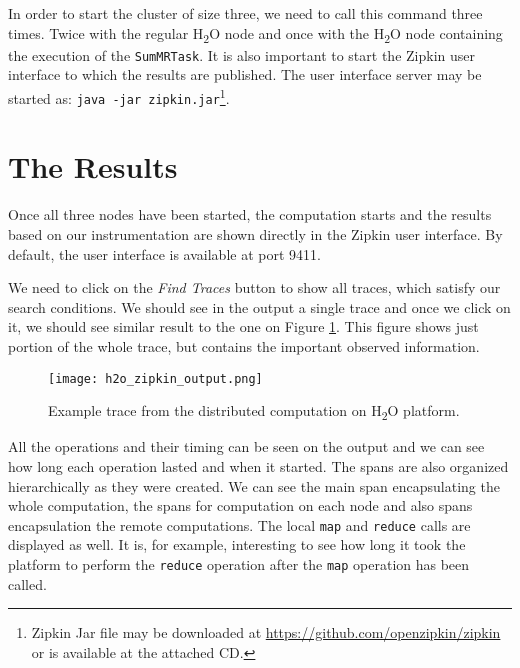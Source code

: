 In order to start the cluster of size three, we need to call this command three times. Twice with the regular H\textsubscript{2}O node and once with the H\textsubscript{2}O node containing the execution of the \texttt{SumMRTask}. It is also important to start the Zipkin user interface to which the results are published. The user interface server may be started as: \texttt{java -jar zipkin.jar}\footnote{Zipkin Jar file may be downloaded at \url{https://github.com/openzipkin/zipkin} or is available at the attached CD.}.
\section{The Results}
Once all three nodes have been started, the computation starts and the results based on our instrumentation are shown directly in the Zipkin user interface. By default, the user interface is available at port 9411.

We need to click on the \textit{Find Traces} button to show all traces, which satisfy our search conditions. We should see in the output a single trace and once we click on it, we should see similar result to the one on Figure \ref{h2o_zipkin_output}. This figure shows just portion of the whole trace, but contains the important observed information.
	\begin{figure}
		\centering
		\texttt{[image: h2o\_zipkin\_output.png]}
		\caption{Example trace from the distributed computation on H\textsubscript{2}O platform.}
		\label{h2o_zipkin_output}
	\end{figure}

All the operations and their timing can be seen on the output and we can see how long each operation lasted and when it started. The spans are also organized hierarchically as they were created. We can see the main span encapsulating the whole computation, the spans for computation on each node and also spans encapsulation the remote computations. The local \texttt{map} and \texttt{reduce} calls are displayed as well. It is, for example, interesting to see how long it took the platform to perform the \texttt{reduce} operation after the \texttt{map} operation has been called.